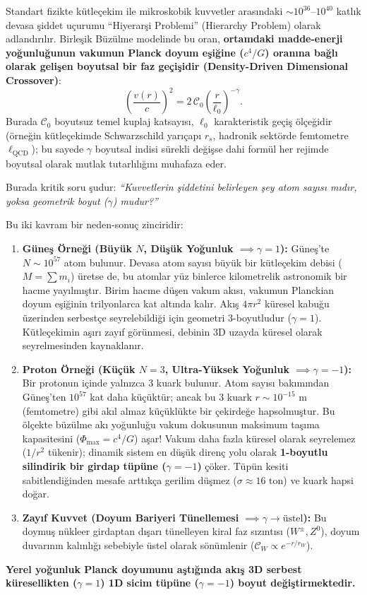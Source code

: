 Standart fizikte kütleçekim ile mikroskobik kuvvetler arasındaki $\sim 10^{36}$--$10^{40}$ katlık devasa şiddet uçurumu ``Hiyerarşi Problemi'' (Hierarchy Problem) olarak adlandırılır. Birleşik Büzülme modelinde bu oran, \textbf{ortamdaki madde-enerji yoğunluğunun vakumun Planck doyum eşiğine ($c^4/G$) oranına bağlı olarak gelişen boyutsal bir faz geçişidir (Density-Driven Dimensional Crossover)}:
\begin{equation}
    \left( \frac{v(r)}{c} \right)^2 = 2 \, \mathcal{C}_0 \left( \frac{r}{\ell_0} \right)^{-\gamma}.
    \label{eq:master_formula_main}
\end{equation}
Burada $\mathcal{C}_0$ boyutsuz temel kuplaj katsayısı, $\ell_0$ karakteristik geçiş ölçeğidir (örneğin kütleçekimde Schwarzschild yarıçapı $r_s$, hadronik sektörde femtometre $\ell_{\mathrm{QCD}}$); bu sayede $\gamma$ boyutsal indisi sürekli değişse dahi formül her rejimde boyutsal olarak mutlak tutarlılığını muhafaza eder.

Burada kritik soru şudur: \textit{``Kuvvetlerin şiddetini belirleyen şey atom sayısı mıdır, yoksa geometrik boyut ($\gamma$) mudur?''}

Bu iki kavram bir neden-sonuç zinciridir:
\begin{enumerate}
    \item \textbf{Güneş Örneği (Büyük $N$, Düşük Yoğunluk $\implies \gamma = 1$):} Güneş'te $N \sim 10^{57}$ atom bulunur. Devasa atom sayısı büyük bir kütleçekim debisi ($M = \sum m_i$) üretse de, bu atomlar yüz binlerce kilometrelik astronomik bir hacme yayılmıştır. Birim hacme düşen vakum akısı, vakumun Planckian doyum eşiğinin trilyonlarca kat altında kalır. Akış $4\pi r^2$ küresel kabuğu üzerinden serbestçe seyrelebildiği için geometri 3-boyutludur ($\gamma = 1$). Kütleçekimin aşırı zayıf görünmesi, debinin 3D uzayda küresel olarak seyrelmesinden kaynaklanır.
    \item \textbf{Proton Örneği (Küçük $N=3$, Ultra-Yüksek Yoğunluk $\implies \gamma = -1$):} Bir protonun içinde yalnızca 3 kuark bulunur. Atom sayısı bakımından Güneş'ten $10^{57}$ kat daha küçüktür; ancak bu 3 kuark $r \sim 10^{-15}\text{ m}$ (femtometre) gibi akıl almaz küçüklükte bir çekirdeğe hapsolmuştur. Bu ölçekte büzülme akı yoğunluğu vakum dokusunun maksimum taşıma kapasitesini ($\Phi_{\max} = c^4/G$) aşar! Vakum daha fazla küresel olarak seyrelemez ($1/r^2$ tükenir); dinamik sistem en düşük direnç yolu olarak \textbf{1-boyutlu silindirik bir girdap tüpüne ($\gamma = -1$)} çöker. Tüpün kesiti sabitlendiğinden mesafe arttıkça gerilim düşmez ($\sigma \approx 16\text{ ton}$) ve kuark hapsi doğar.
    \item \textbf{Zayıf Kuvvet (Doyum Bariyeri Tünellemesi $\implies \gamma \to \text{üstel}$):} Bu doymuş nükleer girdaptan dışarı tünelleyen kiral faz sızıntısı ($W^\pm, Z^0$), doyum duvarının kalınlığı sebebiyle üstel olarak sönümlenir ($\mathcal{C}_W \propto e^{-r/r_W}$).
\end{enumerate}
\textbf{Yerel yoğunluk Planck doyumunu aştığında akış 3D serbest küresellikten ($\gamma=1$) 1D sicim tüpüne ($\gamma=-1$) boyut değiştirmektedir.}

